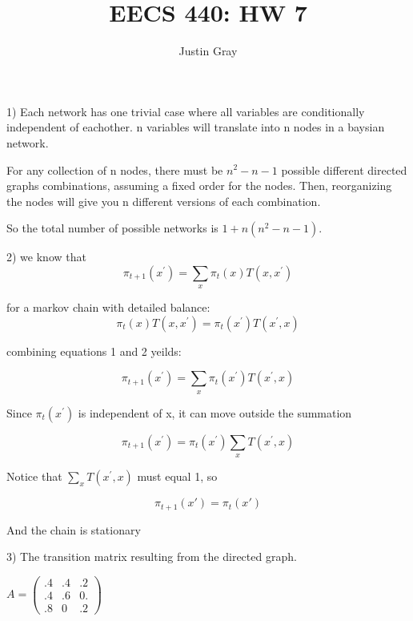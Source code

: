 \documentclass[12pt]{article}
\title{EECS 440: HW 7}
\author{Justin Gray}
\begin{document}
\maketitle
\setcounter{equation}{0}
1) Each network has one trivial case where all variables are conditionally 
independent of eachother. n variables will translate into n nodes in a baysian 
network. 

For any collection of n nodes, there must be $n^2-n-1$ possible different
directed graphs combinations, assuming a fixed order for the nodes. Then, 
reorganizing the nodes will give you n different versions of each combination. 

So the total number of possible networks is $1+ n(n^2-n-1)$. 

\pagebreak
\setcounter{equation}{0}
2) 
we know that
\begin{equation}
    \pi_{t+1}(x^{\prime}) = \sum_x \pi_t(x)T(x,x^{\prime}) 
\end{equation}

for a markov chain with detailed balance: 
\begin{equation}
    \pi_t(x)T(x,x^{\prime}) =  \pi_t(x^{\prime})T(x^{\prime},x)
\end{equation}

combining equations 1 and 2 yeilds: 

\begin{equation}
    \pi_{t+1}(x^{\prime}) = \sum_x \pi_t(x^{\prime})T(x^{\prime},x) 
\end{equation}

Since $\pi_t(x^{\prime})$ is independent of x, it can move outside the summation

\begin{equation}
    \pi_{t+1}(x^{\prime}) = \pi_t(x^{\prime}) \sum_x T(x^{\prime},x) 
\end{equation}

Notice that $\sum_x T(x^{\prime},x)$ must equal 1, so 

\begin{equation}
    \pi_{t+1}(x') = \pi_{t}(x')
\end{equation}

And the chain is stationary



\pagebreak
\setcounter{equation}{0}
3) The transition matrix resulting from the directed graph. 

$
A = \left( \begin{array}{ccc}
.4 & .4 & .2 \\
.4 & .6 & 0. \\
.8 & 0  & .2 \end{array} \right) 
$
\end{document}
